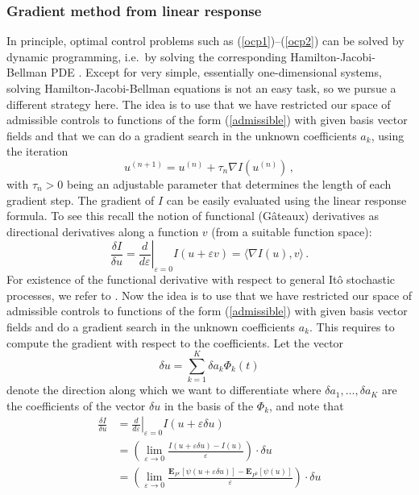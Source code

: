 \documentclass[]{tMPH2e}
\newcommand{\eps}{\varepsilon}
\newcommand{\bE}{{\mathbf E}}
\newcommand{\wrt}{with respect to }
\begin{document}
\subsubsection*{Gradient method from linear response}

In principle, optimal control problems such as (\ref{ocp1})--(\ref{ocp2}) can be solved by dynamic programming, i.e.~by solving the corresponding Hamilton-Jacobi-Bellman PDE \cite{fleming2006}. Except for very simple, essentially one-dimensional systems, solving Hamilton-Jacobi-Bellman equations is not an easy task, so we pursue a different strategy here. The idea is to use that we have restricted our space of admissible controls to functions of the form (\ref{admissible}) with given basis vector fields and that we can do a gradient search in the unknown coefficients $a_{k}$, using the iteration
\[
u^{(n+1)} = u^{(n)} + \tau_{n}\nabla I(u^{(n)})\,,
\]
with $\tau_{n}>0$ being an adjustable parameter that determines the length of each gradient step. The gradient of $I$ can be easily evaluated using the linear response formula. To see this recall the notion of functional (G\^ateaux) derivatives as directional derivatives along a function $v$ (from a suitable function space): 
\begin{equation*}
\frac{\delta I}{\delta u} = \left.\frac{d}{d\eps}\right|_{\eps=0} I(u+\eps v) = \langle\nabla I(u),v\rangle\,.
\end{equation*} 
For existence of the functional derivative \wrt general It\^o stochastic processes, we refer to \cite{bell2006}.  
Now the idea is to use that we have restricted our space of admissible controls to functions of the form (\ref{admissible}) with given basis vector fields and do a gradient search in the unknown coefficients $a_{k}$. This requires to compute the gradient \wrt the coefficients. Let the vector  
\[
\delta u = \sum_{k=1}^K \delta a_k \Phi_k(t)
\]   
denote the direction along which we want to differentiate where $\delta a_{1},\ldots,\delta a_{K}$ are the coefficients of the vector $\delta u$ in the basis of the $\Phi_{k}$, and note that 
\begin{equation*}
\begin{aligned}
\frac{\delta I}{\delta u} & = \left.\frac{d}{d\eps}\right|_{\eps=0} I(u+\eps \delta u)\\
& = \left(\lim_{\eps\to 0}\frac{I(u+\eps\delta u) - I(u)}{\eps}\right)\cdot \delta u\\
& = \left(\lim_{\eps\to 0}\frac{\bE_{P^{\eps}}[\psi(u+\eps \delta u)] - \bE_{P^{0}}[\psi(u)]}{\eps}\right)\cdot\delta u\\
\end{aligned}
\end{equation*} 
\end{document}
